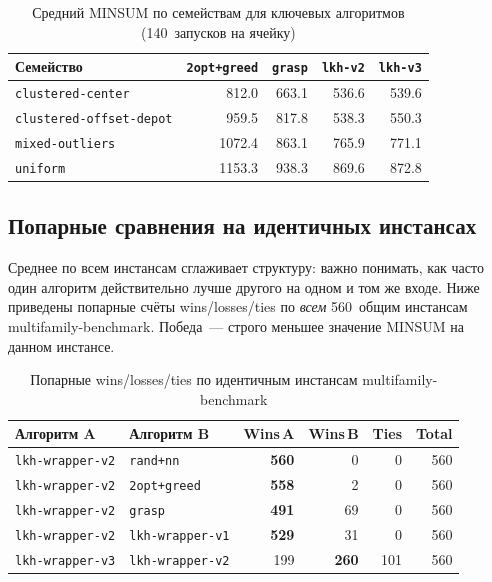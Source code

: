 \documentclass[14pt,a4paper]{extarticle}
\begin{document}
\begin{table}[H]
\centering
\caption{Средний MINSUM по семействам для ключевых алгоритмов (140~запусков на ячейку)}
\small
\begin{tabular}{lrrrr}
\toprule
Семейство & \texttt{2opt+greed} & \texttt{grasp} & \texttt{lkh-v2} & \texttt{lkh-v3}\\
\midrule
\texttt{clustered-center}        &  812.0 &  663.1 &  536.6 &  539.6\\
\texttt{clustered-offset-depot}  &  959.5 &  817.8 &  538.3 &  550.3\\
\texttt{mixed-outliers}          & 1072.4 &  863.1 &  765.9 &  771.1\\
\texttt{uniform}                 & 1153.3 &  938.3 &  869.6 &  872.8\\
\bottomrule
\end{tabular}
\normalsize
\end{table}

\subsection{Попарные сравнения на идентичных инстансах}

Среднее по всем инстансам сглаживает структуру: важно понимать, как часто один алгоритм действительно лучше другого на одном и том же входе. Ниже приведены попарные счёты wins/losses/ties по \emph{всем} 560~общим инстансам multifamily-benchmark. Победа~--- строго меньшее значение MINSUM на данном инстансе.

\begin{table}[H]
\centering
\caption{Попарные wins/losses/ties по идентичным инстансам multifamily-benchmark}
\small
\begin{tabular}{llrrrr}
\toprule
Алгоритм A & Алгоритм B & Wins\,A & Wins\,B & Ties & Total\\
\midrule
\texttt{lkh-wrapper-v2} & \texttt{rand+nn}        & \textbf{560} &   0 &   0 & 560\\
\texttt{lkh-wrapper-v2} & \texttt{2opt+greed}     & \textbf{558} &   2 &   0 & 560\\
\texttt{lkh-wrapper-v2} & \texttt{grasp}          & \textbf{491} &  69 &   0 & 560\\
\texttt{lkh-wrapper-v2} & \texttt{lkh-wrapper-v1} & \textbf{529} &  31 &   0 & 560\\
\texttt{lkh-wrapper-v3} & \texttt{lkh-wrapper-v2} &      199 & \textbf{260} & 101 & 560\\
\bottomrule
\end{tabular}
\normalsize
\end{table}
\end{document}
